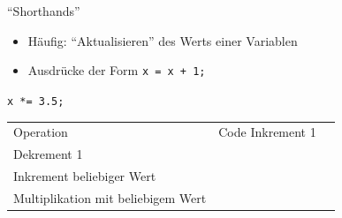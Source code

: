 \begin{frame}[fragile]{\enquote{Shorthands}}
%
\begin{itemize}
	\item Häufig: \enquote{Aktualisieren} des Werts einer Variablen
	\item Ausdrücke der Form \texttt{x = x + 1;}
\end{itemize}
%
\newsavebox{\codeShorthandInc}
%
\newsavebox{\codeShorthandDec}
%
\newsavebox{\codeShorthandManinc}
%
\newsavebox{\codeShorthandManmul}
\savebox{\codeShorthandManmul}
{\texttt{x *= 3.5;}}
%
\begin{tcolorbox}[title=Shorthands in C]
\begin{center}
\begin{table}
	\begin{tabularx}
		{\linewidth}
		{CC}
		\toprule[1pt]
	
		Operation                          & Code \tabcrlf
		Inkrement 1                        & \usebox{\codeShorthandInc} \\
		Dekrement 1                        & \usebox{\codeShorthandDec}  \\
		Inkrement beliebiger Wert          & \usebox{\codeShorthandManinc} \\
		Multiplikation mit beliebigem Wert & \usebox{\codeShorthandManmul} \\
	\end{tabularx}
\end{table}
\end{center}
\end{tcolorbox}
%
\end{frame}


